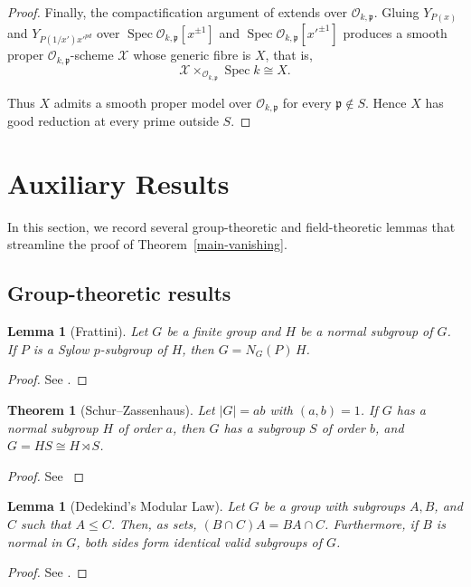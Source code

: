 \documentclass[10pt]{amsart}
\theoremstyle{plain}
\newtheorem{theorem}[thm]{Theorem}
\newtheorem{lemma}[thm]{Lemma}
\theoremstyle{definition}
\begin{document}
\begin{proof}
Finally, the compactification argument of
\cite[Lemma~5.1, Proposition~5.2]{AB}
extends over
\(\mathcal{O}_{k,\mathfrak p}\). Gluing
\(Y_{P(x)}\) and
\(Y_{P(1/x')x'^{pd}}\) over
\(\operatorname{Spec}\mathcal{O}_{k,\mathfrak p}[x^{\pm1}]\) and
\(\operatorname{Spec}\mathcal{O}_{k,\mathfrak p}[x'^{\pm1}]\)
produces a smooth proper
\(\mathcal{O}_{k,\mathfrak p}\)-scheme
\(\mathcal X\) whose generic fibre is \(X\), that is,
\[
\mathcal X\times_{\mathcal{O}_{k,\mathfrak p}}
\operatorname{Spec}k
\cong
X.
\]

Thus \(X\) admits a smooth proper model over
\(\mathcal{O}_{k,\mathfrak p}\) for every
\(\mathfrak p\notin S\). Hence \(X\) has good reduction at every prime outside \(S\).
\end{proof}

\section{Auxiliary Results}
In this section, we record several group-theoretic and field-theoretic lemmas that streamline the proof of Theorem~\ref{main-vanishing}.
\subsection{Group-theoretic results}

\begin{lemma}[Frattini]\label{Frattini's argument}
Let $G$ be a finite group and $H$ be a normal subgroup of $G$. If $P$ is a Sylow $p$-subgroup of $H$, then $G=N_G(P)\,H$.
\end{lemma}
\begin{proof}
See \cite[Theorem~3.1.4]{Zas}.   
\end{proof}

\begin{theorem}[Schur--Zassenhaus]\label{Schur--Zassenhaus}
Let $|G|=ab$ with $(a,b)=1$. If $G$ has a normal subgroup $H$ of order $a$, then $G$ has a subgroup $S$ of order $b$, and $G=HS\cong H\rtimes S$.
\end{theorem}
\begin{proof}
    See \cite[Theorem~6.2.1]{Zas}
\end{proof}
\begin{lemma}[Dedekind's Modular Law]\label{Group theory lemma for compositum}
     Let $G$ be a group with subgroups $A, B$, and $C$ such that $A \leq C$. Then, as sets, $(B \cap C)A = BA \cap C$. Furthermore, if $B$ is normal in $G$, both sides form identical valid subgroups of $G$.
\end{lemma}
\begin{proof}
See \cite[Lemma~1.3.14]{Robinson}.
\end{proof}
\end{document}
